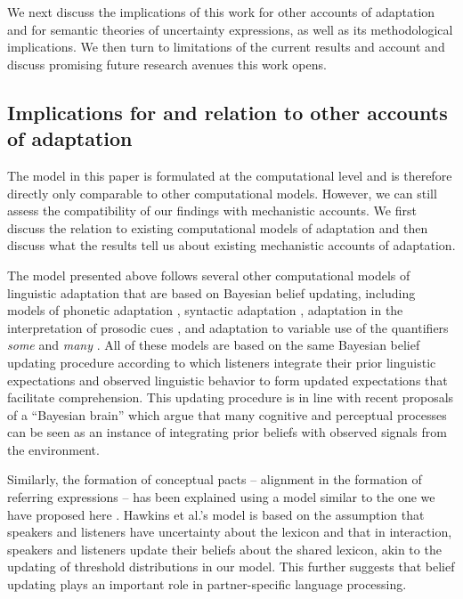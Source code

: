 \documentclass[man, floatsintext]{apa6}
\begin{document}
We next discuss the implications of this work for other accounts of adaptation and for semantic theories of uncertainty expressions, as well as its methodological implications. We then turn to limitations of the current results and account and discuss promising future research avenues this work opens. 



\subsection{Implications for and relation to other accounts of adaptation}

The model in this paper is formulated at the computational level \parencite{Marr1982,Anderson1990} 
and is therefore directly only comparable to other computational models. However, we can still assess 
the compatibility of our findings with mechanistic accounts. We first discuss the relation to existing computational 
models of adaptation and then discuss what the results tell us about existing mechanistic accounts of
 adaptation.

The model presented above follows several other computational models of linguistic adaptation that are based 
on Bayesian belief updating, including models of phonetic adaptation \parencite{Kleinschmidt2015}, syntactic 
adaptation \parencite{Kleinschmidt2012}, adaptation in the interpretation of prosodic cues \parencite{Roettger2019},
and adaptation to variable use of the quantifiers \textit{some} and \textit{many} \parencite{Qing2014}. 
All of these models are based on the same Bayesian belief updating procedure according to which listeners integrate
their prior linguistic expectations and observed linguistic behavior to form updated expectations that facilitate comprehension.
This updating procedure is in line with recent proposals of a ``Bayesian brain'' \parencite[e.g.,][]{Clark2013,Friston2010} which argue that
many cognitive and perceptual processes can be seen as an instance of integrating prior beliefs with observed signals from the environment.


Similarly, the formation of conceptual pacts \parencite{Clark1986} --  alignment in the formation of referring expressions -- has been explained using a model  similar to the one we have proposed here \parencite{Hawkins2017}. Hawkins et al.'s model is based on the assumption that speakers and listeners have uncertainty about the lexicon \parencite[see also][]{Bergen2016} and that in interaction, speakers 
and listeners update their beliefs about the shared lexicon, akin to the updating of threshold distributions 
in our model. This further suggests that belief updating plays an important role in partner-specific language processing.
\end{document}
